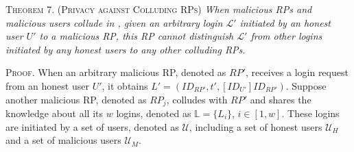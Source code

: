 

\vspace{3mm}
\noindent \textsc{Theorem 7. (Privacy against Colluding RPs)} {\em
When malicious RPs and malicious users collude in \usso, given an arbitrary login $\mathcal{L'}$ initiated by an honest user $U'$ to a malicious RP, this RP cannot distinguish $\mathcal{L'}$ from other logins initiated by any honest users to any other colluding RPs.}




\vspace{0.75mm}
\noindent\textsc{Proof.}
When an arbitrary malicious RP, denoted as $RP'$, receives a login request from an honest user $U'$, it obtains $L' = (ID_{RP'}, t', [ID_{U'}]ID_{RP'})$. Suppose another malicious RP, denoted as $RP_j$, colludes with $RP'$ and shares the knowledge about all its $w$ logins, denoted as $\mathbb{L} = \{{L_{i}}\}$, $i \in [1, w]$. These logins are initiated by a set of users, denoted as $\mathcal{U}$, including a set of honest users $\mathcal{U}_H$ and a set of malicious users $\mathcal{U}_M$.

